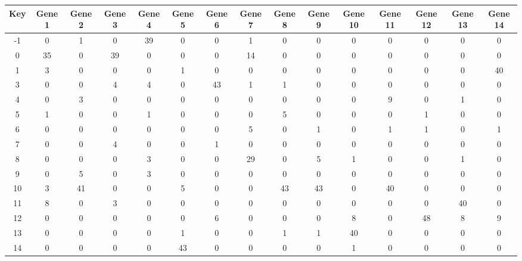 \begin{tabular}{|c|c|c|c|c|c|c|c|c|c|c|c|c|c|c|}
\hline
Key & Gene 1 & Gene 2 & Gene 3 & Gene 4 & Gene 5 & Gene 6 & Gene 7 & Gene 8 & Gene 9 & Gene 10 & Gene 11 & Gene 12 & Gene 13 & Gene 14 \\
\hline
-1 & 0 & 1 & 0 & 39 & 0 & 0 & 1 & 0 & 0 & 0 & 0 & 0 & 0 & 0 \\
0 & 35 & 0 & 39 & 0 & 0 & 0 & 14 & 0 & 0 & 0 & 0 & 0 & 0 & 0 \\
1 & 3 & 0 & 0 & 0 & 1 & 0 & 0 & 0 & 0 & 0 & 0 & 0 & 0 & 40 \\
3 & 0 & 0 & 4 & 4 & 0 & 43 & 1 & 1 & 0 & 0 & 0 & 0 & 0 & 0 \\
4 & 0 & 3 & 0 & 0 & 0 & 0 & 0 & 0 & 0 & 0 & 9 & 0 & 1 & 0 \\
5 & 1 & 0 & 0 & 1 & 0 & 0 & 0 & 5 & 0 & 0 & 0 & 1 & 0 & 0 \\
6 & 0 & 0 & 0 & 0 & 0 & 0 & 5 & 0 & 1 & 0 & 1 & 1 & 0 & 1 \\
7 & 0 & 0 & 4 & 0 & 0 & 1 & 0 & 0 & 0 & 0 & 0 & 0 & 0 & 0 \\
8 & 0 & 0 & 0 & 3 & 0 & 0 & 29 & 0 & 5 & 1 & 0 & 0 & 1 & 0 \\
9 & 0 & 5 & 0 & 3 & 0 & 0 & 0 & 0 & 0 & 0 & 0 & 0 & 0 & 0 \\
10 & 3 & 41 & 0 & 0 & 5 & 0 & 0 & 43 & 43 & 0 & 40 & 0 & 0 & 0 \\
11 & 8 & 0 & 3 & 0 & 0 & 0 & 0 & 0 & 0 & 0 & 0 & 0 & 40 & 0 \\
12 & 0 & 0 & 0 & 0 & 0 & 6 & 0 & 0 & 0 & 8 & 0 & 48 & 8 & 9 \\
13 & 0 & 0 & 0 & 0 & 1 & 0 & 0 & 1 & 1 & 40 & 0 & 0 & 0 & 0 \\
14 & 0 & 0 & 0 & 0 & 43 & 0 & 0 & 0 & 0 & 1 & 0 & 0 & 0 & 0 \\
\hline
\end{tabular}